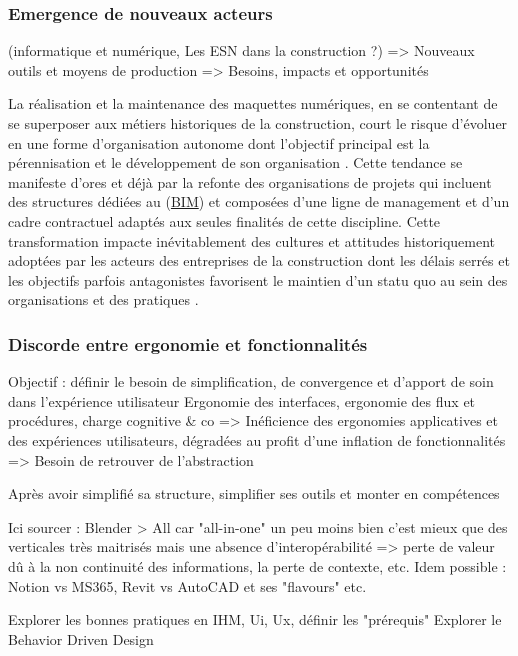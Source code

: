 \documentclass[a4paper,12pt]{article}
\begin{document}
\subsubsection{Emergence de nouveaux acteurs}
\label{sec:org2d3b1b7}
(informatique et numérique, Les ESN dans la construction ?)
=> Nouveaux outils et moyens de production
=> Besoins, impacts et opportunités

La réalisation et la maintenance des maquettes numériques, en se contentant de se superposer aux métiers historiques de la construction, court le risque d’évoluer en une forme d’organisation autonome dont l’objectif principal est la pérennisation et le développement de son organisation \autocite{lourauAnalyseInstitutionnelleQuestion1973}. Cette tendance se manifeste d’ores et déjà par la refonte des organisations de projets qui incluent des structures dédiées au  (\protect\hyperlink{gls-1}{\label{gls-1-use-1}BIM}) et composées d’une ligne de management et d’un cadre contractuel adaptés aux seules finalités de cette discipline.
Cette transformation impacte inévitablement des cultures et attitudes historiquement adoptées par les acteurs des entreprises de la construction dont les délais serrés et les objectifs parfois antagonistes favorisent le maintien d’un statu quo au sein des organisations et des pratiques \autocite{lindbladBIMImplementationOrganisational2015,paulagordogregorioContinuiteInformationnelleDans2023}. 
\subsubsection{Discorde entre ergonomie et fonctionnalités}
\label{sec:orgf9adfbc}
Objectif : définir le besoin de simplification, de convergence et d'apport de soin dans l'expérience utilisateur
Ergonomie des interfaces, ergonomie des flux et procédures, charge cognitive \& co
=> Inéficience des ergonomies applicatives et des expériences utilisateurs, dégradées au profit d'une inflation de fonctionnalités
=> Besoin de retrouver de l'abstraction

Après avoir simplifié sa structure, simplifier ses outils et monter en compétences

Ici sourcer : Blender > All car "all-in-one" un peu moins bien c'est mieux que des verticales très maitrisés mais une absence d'interopérabilité => perte de valeur dû à la non continuité des informations, la perte de contexte, etc.
Idem possible : Notion vs MS365, Revit vs AutoCAD et ses "flavours"
etc.

Explorer les bonnes pratiques en IHM, Ui, Ux, définir les "prérequis" 
Explorer le Behavior Driven Design 
\end{document}
